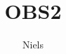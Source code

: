 \documentclass[a4paper,11pt]{article}
\title{OBS2}
\author{Niels}
\begin{document}
\maketitle

\begin{sketch}

\end{sketch}
\end{document}
